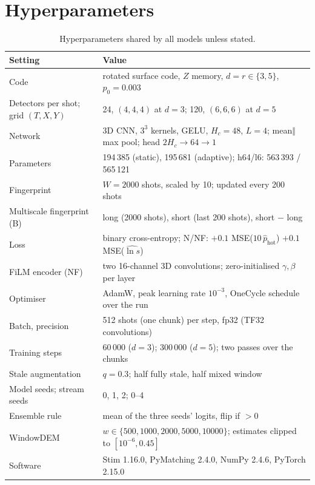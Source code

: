 \documentclass[11pt,a4paper]{article}
\begin{document}
\printbibliography

\clearpage
\appendix
\section{Hyperparameters}\label{app:hyper}

\begin{table}[htbp]
\centering
\small
\begin{tabularx}{\linewidth}{@{}lX@{}}
\toprule
Setting & Value \\
\midrule
Code & rotated surface code, $Z$ memory, $d=r\in\{3,5\}$, $p_0=0.003$ \\
Detectors per shot; grid $(T,X,Y)$ & 24, $(4,4,4)$ at $d=3$; 120, $(6,6,6)$ at $d=5$ \\
Network & 3D CNN, $3^3$ kernels, GELU, $H_c=48$, $L=4$; mean$\Vert$max pool; head $2H_c\to64\to1$ \\
Parameters & 194\,385 (static), 195\,681 (adaptive); h64/l6: 563\,393 / 565\,121 \\
Fingerprint & $W=2000$ shots, scaled by 10; updated every 200 shots \\
Multiscale fingerprint (B) & long (2000 shots), short (last 200 shots), short $-$ long \\
Loss & binary cross-entropy; N/NF: $+0.1$ MSE($10\,\hat p_{\mathrm{hot}}$) $+0.1$ MSE($\widehat{\ln s}$) \\
FiLM encoder (NF) & two 16-channel 3D convolutions; zero-initialised $\gamma,\beta$ per layer \\
Optimiser & AdamW, peak learning rate $10^{-3}$, OneCycle schedule over the run \\
Batch, precision & 512 shots (one chunk) per step, fp32 (TF32 convolutions) \\
Training steps & 60\,000 ($d=3$); 300\,000 ($d=5$); two passes over the chunks \\
Stale augmentation & $q=0.3$; half fully stale, half mixed window \\
Model seeds; stream seeds & 0, 1, 2; 0--4 \\
Ensemble rule & mean of the three seeds' logits, flip if $>0$ \\
WindowDEM & $w\in\{500,1000,2000,5000,10000\}$; estimates clipped to $[10^{-6},0.45]$ \\
Software & Stim 1.16.0, PyMatching 2.4.0, NumPy 2.4.6, PyTorch 2.15.0 \\
\bottomrule
\end{tabularx}
\caption{Hyperparameters shared by all models unless stated.}
\label{tab:hyper}
\end{table}
\end{document}
